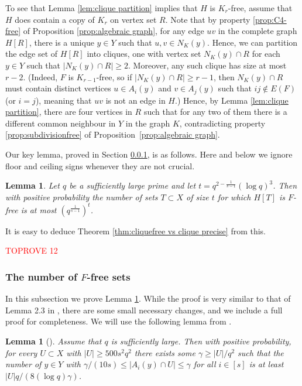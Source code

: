 \documentclass[11pt]{article}
\let\oldendproof\endproof
\renewenvironment{proof}[1][\proofname]{\oldproof[\bf #1]}{\oldendproof}
\theoremstyle{plain}
\newtheorem{lemma}[theorem]{Lemma}
\theoremstyle{definition}
\begin{document}
To see that Lemma \ref{lem:clique partition} implies that $H$ is $K_r$-free, assume that $H$ does contain a copy of $K_r$ on vertex set $R$. Note that by property \ref{prop:C4-free} of Proposition \ref{prop:algebraic graph}, for any edge $uv$ in the complete graph $H[R]$, there is a unique $y\in Y$ such that $u,v\in N_K(y)$. Hence, we can partition the edge set of $H[R]$ into cliques, one with vertex set $N_K(y)\cap R$ for each $y\in Y$ such that $|N_K(y)\cap R|\geq 2$. Moreover, any such clique has size at most $r-2$. (Indeed, $F$ is $K_{r-1}$-free, so if $|N_K(y)\cap R|\geq r-1$, then $N_K(y)\cap R$ must contain distinct vertices $u\in A_i(y)$ and $v\in A_j(y)$ such that $ij\not \in E(F)$ (or $i=j$), meaning that $uv$ is not an edge in $H$.) Hence, by Lemma \ref{lem:clique partition}, there are four vertices in $R$ such that for any two of them there is a different common neighbour in $Y$ in the graph $K$, contradicting property \ref{prop:subdivisionfree} of Proposition~\ref{prop:algebraic graph}.

Our key lemma, proved in Section \ref{sec:Ffree sets}, is as follows. Here and below we ignore floor and ceiling signs whenever they are not crucial.

\begin{lemma} \label{lem:few F-free}
    Let $q$ be a sufficiently large prime and let $t=q^{2-\frac{1}{s-1}}(\log q)^{3}$. Then with positive probability the number of sets $T\subset X$ of size $t$ for which $H[T]$ is $F$-free is at most $(q^{\frac{1}{s-1}})^t$.
\end{lemma}

It is easy to deduce Theorem \ref{thm:cliquefree vs clique precise} from this.

\begin{proof}\textcolor{red}{TOPROVE 12}\end{proof}

\subsubsection{The number of $F$-free sets} \label{sec:Ffree sets}

In this subsection we prove Lemma \ref{lem:few F-free}. While the proof is very similar to that of Lemma 2.3 in \cite{Janzer_Sudakov}, there are some small necessary changes, and we include a full proof for completeness. We will use the following lemma from \cite{Janzer_Sudakov}.

\begin{lemma}[{\cite[Lemma 2.4]{Janzer_Sudakov}}] \label{lem:thereisgoodscale}
    Assume that $q$ is sufficiently large. Then with positive probability, for every $U\subset X$ with $|U|\geq 500s^2q^2$ there exists some $\gamma\geq |U|/q^2$ such that the number of $y\in Y$ with $\gamma/(10s)\leq|A_i(y)\cap U|\leq \gamma$ for all $i\in [s]$ is at least $|U|q/(8(\log q)\gamma)$.
\end{lemma}
\end{document}
